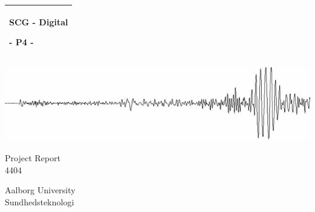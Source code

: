 %
%
%
%
%
\begin{titlepage}
  \addtolength{\hoffset}{0.5\evensidemargin-0.5\oddsidemargin} %
  \noindent%
  \begin{tabular}{@{}p{\textwidth}@{}}
    \toprule[2pt]
    \midrule
    \vspace{0.2cm}
    \begin{center}
    \Huge{\textbf{
      SCG - Digital%
    }}
    \end{center}
    \begin{center}
      \Large{
        - P4 -%
      }
    \end{center}
    \vspace{0.2cm}\\
    \midrule
    \toprule[2pt]
  \end{tabular}

    \includegraphics[width=\linewidth]{figures/SCG_frontpage}

  \vspace{4 cm}
  \begin{center}
    {\large
      Project Report%
    }\\
    \vspace{0.2cm}
    {\Large
      4404%
    }
  \end{center}
  \vfill
  \begin{center}
  Aalborg University\\
  Sundhedsteknologi
  \end{center}
\end{titlepage}
\clearpage
